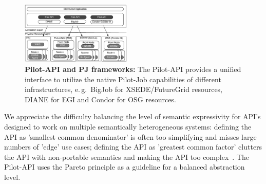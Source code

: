 \documentclass[conference]{IEEEtran}
\begin{document}
\begin{figure}[b]
    \centering
    \up\up
    \includegraphics[width=0.47\textwidth]{../figures/distributed_pilot_job.pdf}
    \caption{\textbf{Pilot-API and PJ frameworks:} The Pilot-API provides 
      a unified interface to utilize the native Pilot-Job capabilities of
      different infrastructures, e.\,g.\ BigJob for XSEDE/FutureGrid
      resources, DIANE for EGI and Condor for OSG resources.
  }
    \label{fig:figures_distributed_pilot_job}
\end{figure}

We appreciate the difficulty balancing the level of semantic
expressivity for API's designed to work on multiple semantically
heterogeneous systems: defining the API as 'smallest common
denominator' is often too simplifying and misses large numbers of
'edge' use cases; defining the API as 'greatest common factor'
clutters the API with non-portable semantics and making the API too
complex~\cite{leaky_abstractions}.  The Pilot-API uses the Pareto
principle as a guideline for a balanced abstraction level.





\end{document}
